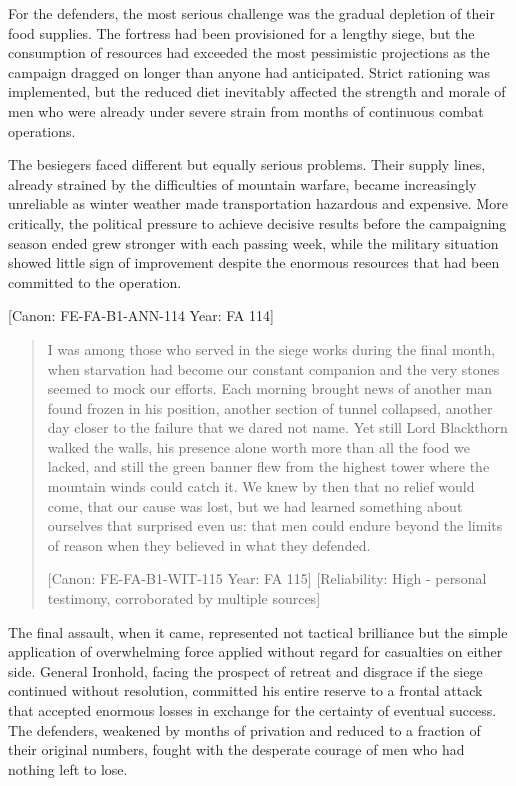 For the defenders, the most serious challenge was the gradual depletion
of their food supplies. The fortress had been provisioned for a lengthy
siege, but the consumption of resources had exceeded the most
pessimistic projections as the campaign dragged on longer than anyone
had anticipated. Strict rationing was implemented, but the reduced diet
inevitably affected the strength and morale of men who were already
under severe strain from months of continuous combat operations.

The besiegers faced different but equally serious problems. Their supply
lines, already strained by the difficulties of mountain warfare, became
increasingly unreliable as winter weather made transportation hazardous
and expensive. More critically, the political pressure to achieve
decisive results before the campaigning season ended grew stronger with
each passing week, while the military situation showed little sign of
improvement despite the enormous resources that had been committed to
the operation.

{[}Canon: FE-FA-B1-ANN-114 \textbar{} Year: FA 114{]}

\begin{quote}
I was among those who served in the siege works during the final month,
when starvation had become our constant companion and the very stones
seemed to mock our efforts. Each morning brought news of another man
found frozen in his position, another section of tunnel collapsed,
another day closer to the failure that we dared not name. Yet still Lord
Blackthorn walked the walls, his presence alone worth more than all the
food we lacked, and still the green banner flew from the highest tower
where the mountain winds could catch it. We knew by then that no relief
would come, that our cause was lost, but we had learned something about
ourselves that surprised even us: that men could endure beyond the
limits of reason when they believed in what they defended.

{[}Canon: FE-FA-B1-WIT-115 \textbar{} Year: FA 115{]} {[}Reliability:
High - personal testimony, corroborated by multiple sources{]}
\end{quote}

The final assault, when it came, represented not tactical brilliance but
the simple application of overwhelming force applied without regard for
casualties on either side. General Ironhold, facing the prospect of
retreat and disgrace if the siege continued without resolution,
committed his entire reserve to a frontal attack that accepted enormous
losses in exchange for the certainty of eventual success. The defenders,
weakened by months of privation and reduced to a fraction of their
original numbers, fought with the desperate courage of men who had
nothing left to lose.

